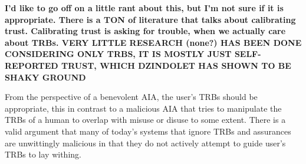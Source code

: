     \textbf{I'd like to go off on a little rant about this, but I'm not sure if it is appropriate. There is a TON of literature that talks about calibrating trust. Calibrating trust is asking for trouble, when we actually care about TRBs. VERY LITTLE RESEARCH  (none?) HAS BEEN DONE CONSIDERING ONLY TRBS, IT IS MOSTLY JUST SELF-REPORTED TRUST, WHICH DZINDOLET HAS SHOWN TO BE SHAKY GROUND}

    From the perspective of a benevolent AIA, the user's TRBs should be appropriate, this in contrast to a malicious AIA that tries to manipulate the TRBs of a human to overlap with misuse or disuse to some extent. There is a valid argument that many of today's systems that ignore TRBs and assurances are unwittingly malicious in that they do not actively attempt to guide user's TRBs to lay withing.


    
